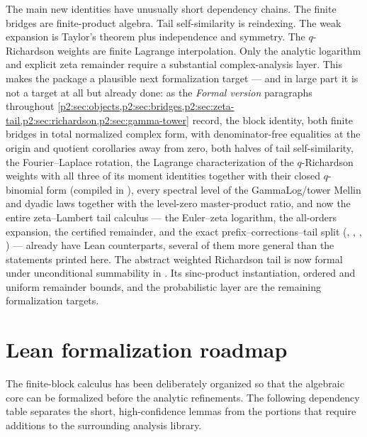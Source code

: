 \documentclass[11pt,oneside]{article}
\numberwithin{equation}{section}
\theoremstyle{definition}
\theoremstyle{remark}
\begin{document}
The main new identities have unusually short dependency chains.  The finite bridges are
finite-product algebra.  Tail self-similarity is reindexing.  The weak expansion is Taylor's
theorem plus independence and symmetry.  The $q$-Richardson weights are finite Lagrange
interpolation.  Only the analytic logarithm and explicit zeta remainder require a substantial
complex-analysis layer.  This makes the package a plausible next formalization target --- and
in large part it is not a target at all but already done: as the \emph{Formal version}
paragraphs throughout \cref{p2:sec:objects,p2:sec:bridges,p2:sec:zeta-tail,p2:sec:richardson,p2:sec:gamma-tower}
record, the block identity, both finite bridges in total normalized complex form, with
denominator-free equalities at the origin and quotient corollaries away from zero, both halves of
tail self-similarity, the Fourier--Laplace rotation, the Lagrange characterization of the
$q$-Richardson weights with all three of its moment identities together with their closed
$q$-binomial form (compiled in ), every spectral
level of the GammaLog/tower Mellin and dyadic laws together with the level-zero
master-product ratio, and now the entire zeta--Lambert tail calculus --- the Euler--zeta
logarithm, the all-orders expansion, the certified remainder, and the exact
prefix--corrections--tail split (, ,
, ) --- already have Lean
counterparts, several of them more general than the statements printed here.  The abstract
weighted Richardson tail is now formal under unconditional summability in
.  Its sinc-product instantiation, ordered and uniform
remainder bounds, and the probabilistic layer are the remaining formalization targets.

\section{Lean formalization roadmap}
\label{p2:sec:formalization}

The finite-block calculus has been deliberately organized so that the algebraic core can be
formalized before the analytic refinements.  The following dependency table separates the
short, high-confidence lemmas from the portions that require additions to the surrounding
analysis library.
\end{document}
